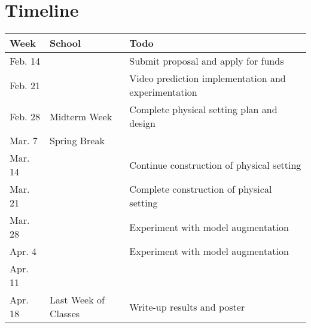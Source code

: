 \documentclass[10pt, letterpaper]{article}
\begin{document}
\section{Timeline}

\begin{center}
	\begin{tabular}{ l l l }
		Week & School & Todo \\ \hline
		Feb. 14 & & Submit proposal and apply for funds \\
		Feb. 21 & & Video prediction implementation and experimentation \\
		Feb. 28 & Midterm Week & Complete physical setting plan and design \\
		Mar. 7 & Spring Break &  \\
		Mar. 14 & & Continue construction of physical setting \\
		Mar. 21 & & Complete construction of physical setting \\
		Mar. 28 & & Experiment with model augmentation \\
		Apr. 4 & & Experiment with model augmentation \\
		Apr. 11 & & \\
		Apr. 18 & Last Week of Classes & Write-up results and poster\\
	\end{tabular}
\end{center}


\end{document}
